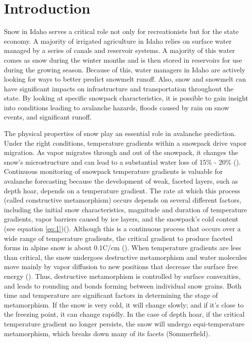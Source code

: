 \chapter{Introduction}
Snow in Idaho serves a critical role not only for recreationists but for the state economy. A majority of irrigated agriculture in Idaho relies on surface water managed by a series of canals and reservoir systems. A majority of this water comes as snow during the winter months and is then stored in reservoirs for use during the growing season. Because of this, water managers in Idaho are actively looking for ways to better predict snowmelt runoff. Also, snow and snowmelt can have significant impacts on infrastructure and transportation throughout the state. By looking at specific snowpack characteristics, it is possible to gain insight into conditions leading to avalanche hazards, floods caused by rain on snow events, and significant runoff.  

The physical properties of snow play an essential role in avalanche prediction. Under the right conditions, temperature gradients within a snowpack drive vapor migration. As vapor migrates through and out of the snowpack, it changes the snow's microstructure and can lead to a substantial water loss of 15\% - 20\% (\cite{hood_williams_cline_1999, marks_dozier_1992, kattelmann_elder_1991}). Continuous monitoring of snowpack temperature gradients is valuable for avalanche forecasting because the development of weak, faceted layers, such as depth hoar, depends on a temperature gradient. The rate at which this process (called constructive metamorphism) occurs depends on several different factors, including the initial snow characteristics, magnitude and duration of temperature gradients, vapor barriers caused by ice layers, and the snowpack's cold content (see equation \ref{eq:1})(\cite{sommerfeld_1970, colbeck1983theory}). Although this is a continuous process that occurs over a wide range of temperature gradients, the critical gradient to produce faceted forms in alpine snow is about 0.1\textdegree C/cm (\cite{mcclung_schaerer_2009}). When temperature gradients are less than critical, the snow undergoes destructive metamorphism and water molecules move mainly by vapor diffusion to new positions that decrease the surface free energy (\cite{sommerfeld_1970}). Thus, destructive metamorphism is controlled by surface convexities, and leads to rounding and bonds forming between individual snow grains. Both time and temperature are significant factors in determining the stage of metamorphism. If the snow is very cold, it will change slowly; and if it's close to the freezing point, it can change rapidly. In the case of depth hoar, if the critical temperature gradient no longer persists, the snow will undergo equi-temperature metamorphism, which breaks down many of its facets (Sommerfield).


